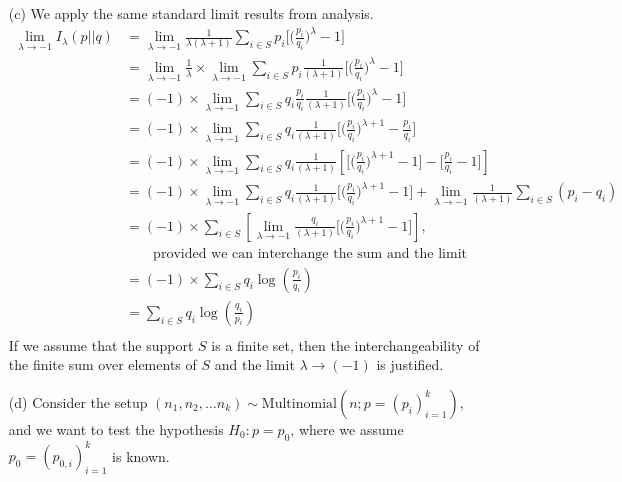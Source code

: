 \documentclass[12pt]{article}
\begin{document}
\begin{enumerate}
\begin{solution}
\begin{enumerate}
	\item[(c)] We apply the same standard limit results from analysis.
	\begin{align*}
	\lim_{\lambda \rightarrow -1} I_\lambda\left(p || q\right) & = \lim_{\lambda \rightarrow -1}\frac{1}{\lambda(\lambda + 1)} \sum_{i \in S}p_i \bigg[\bigg(\frac{p_i}{q_i} \bigg)^\lambda - 1\bigg]\\
	& = \lim_{\lambda \rightarrow -1}\frac{1}{\lambda} \times \lim_{\lambda \rightarrow -1}\sum_{i \in S}p_i\frac{1}{(\lambda+1)} \bigg[\bigg(\frac{p_i}{q_i} \bigg)^\lambda - 1\bigg]\\
	& = (-1) \times \lim_{\lambda \rightarrow -1}\sum_{i \in S}q_i \frac{p_i}{q_i}\frac{1}{(\lambda+1)} \bigg[\bigg(\frac{p_i}{q_i} \bigg)^\lambda - 1\bigg]\\
	& = (-1) \times \lim_{\lambda \rightarrow -1}\sum_{i \in S}q_i \frac{1}{(\lambda+1)} \bigg[\bigg(\frac{p_i}{q_i} \bigg)^{\lambda+1} - \frac{p_i}{q_i}\bigg]\\
	& = (-1) \times \lim_{\lambda \rightarrow -1}\sum_{i \in S}q_i \frac{1}{(\lambda+1)} \left[\bigg[\bigg(\frac{p_i}{q_i} \bigg)^{\lambda+1} - 1\bigg] - \bigg[\frac{p_i}{q_i} - 1\bigg]\right]\\
	& = (-1) \times \lim_{\lambda \rightarrow -1}\sum_{i \in S}q_i \frac{1}{(\lambda+1)} \bigg[\bigg(\frac{p_i}{q_i} \bigg)^{\lambda+1} - 1\bigg] + \lim_{\lambda \rightarrow -1} \frac{1}{(\lambda + 1)}\sum_{i \in S}(p_i - q_i)\\
	& = (-1) \times \sum_{i \in S}\left[\lim_{\lambda \rightarrow -1} \frac{q_i}{(\lambda+1)} \bigg[\bigg(\frac{p_i}{q_i} \bigg)^{\lambda+1} - 1\bigg]\right],\\
	& \qquad \text{provided we can interchange the sum and the limit}\\
	& = (-1)\times\sum_{i \in S} q_i \log\left(\frac{p_i}{q_i}\right)\\
	& = \sum_{i \in S} q_i \log\left(\frac{q_i}{p_i}\right)\\
	\end{align*}
	If we assume that the support $S$ is a finite set, then the interchangeability of the finite sum over elements of $S$ and the limit $\lambda\rightarrow (-1)$ is justified.
	
	\item[(d)] Consider the setup $\left(n_1, n_2,\dots n_k\right) \sim \text{Multinomial}\left(n;p = \left(p_i\right)_{i=1}^{k}\right)$, and we want to test the hypothesis $H_0: p=p_0$, where we assume $p_0 = \left(p_{0,i}\right)_{i=1}^{k}$ is known.\par 
	

\end{enumerate}
\end{solution}
\end{enumerate}
\end{document}
